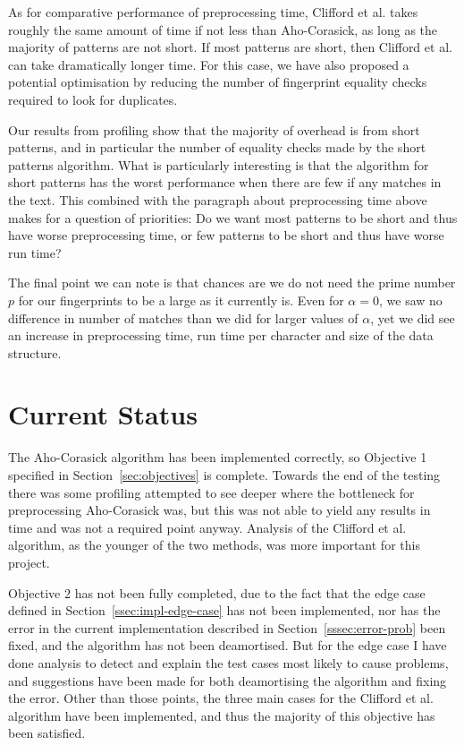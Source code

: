 \documentclass[ %
                    author={Dominic Joseph Moylett},
                    degree={MEng},
                     title={Dictionary Matching with Fingerprints},
                  subtitle={An Empirical Analysis},
                      type={research},
                      year={2015} ]{dissertation}
\begin{document}
As for comparative performance of preprocessing time, Clifford et al. takes roughly the same amount of time if not less than Aho-Corasick, as long as the majority of patterns are not short. If most patterns are short, then Clifford et al. can take dramatically longer time. For this case, we have also proposed a potential optimisation by reducing the number of fingerprint equality checks required to look for duplicates.

Our results from profiling show that the majority of overhead is from short patterns, and in particular the number of equality checks made by the short patterns algorithm. What is particularly interesting is that the algorithm for short patterns has the worst performance when there are few if any matches in the text. This combined with the paragraph about preprocessing time above makes for a question of priorities: Do we want most patterns to be short and thus have worse preprocessing time, or few patterns to be short and thus have worse run time?

The final point we can note is that chances are we do not need the prime number $p$ for our fingerprints to be a large as it currently is. Even for $\alpha = 0$, we saw no difference in number of matches than we did for larger values of $\alpha$, yet we did see an increase in preprocessing time, run time per character and size of the data structure.

\section{Current Status}

The Aho-Corasick algorithm has been implemented correctly, so Objective 1 specified in Section~\ref{sec:objectives} is complete. Towards the end of the testing there was some profiling attempted to see deeper where the bottleneck for preprocessing Aho-Corasick was, but this was not able to yield any results in time and was not a required point anyway. Analysis of the Clifford et al. algorithm, as the younger of the two methods, was more important for this project.

Objective 2 has not been fully completed, due to the fact that the edge case defined in Section~\ref{ssec:impl-edge-case} has not been implemented, nor has the error in the current implementation described in Section~\ref{sssec:error-prob} been fixed, and the algorithm has not been deamortised. But for the edge case I have done analysis to detect and explain the test cases most likely to cause problems, and suggestions have been made for both deamortising the algorithm and fixing the error. Other than those points, the three main cases for the Clifford et al. algorithm have been implemented, and thus the majority of this objective has been satisfied.
\end{document}
